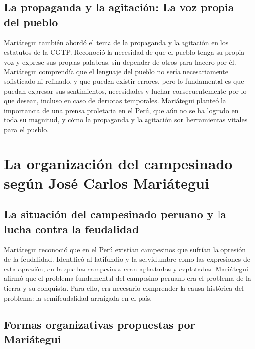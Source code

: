 \documentclass[
  letterpaper,
  DIV=11,
  numbers=noendperiod]{scrartcl}
\begin{document}
\hypertarget{la-propaganda-y-la-agitaciuxf3n-la-voz-propia-del-pueblo}{%
\subsection{La propaganda y la agitación: La voz propia del
pueblo}\label{la-propaganda-y-la-agitaciuxf3n-la-voz-propia-del-pueblo}}

Mariátegui también abordó el tema de la propaganda y la agitación en los
estatutos de la CGTP. Reconoció la necesidad de que el pueblo tenga su
propia voz y exprese sus propias palabras, sin depender de otros para
hacero por él. Mariátegui comprendía que el lenguaje del pueblo no sería
necesariamente sofisticado ni refinado, y que pueden existir errores,
pero lo fundamental es que puedan expresar sus sentimientos, necesidades
y luchar consecuentemente por lo que desean, incluso en caso de derrotas
temporales. Mariátegui planteó la importancia de una prensa proletaria
en el Perú, que aún no se ha logrado en toda su magnitud, y cómo la
propaganda y la agitación son herramientas vitales para el pueblo.

\hypertarget{la-organizaciuxf3n-del-campesinado-seguxfan-josuxe9-carlos-mariuxe1tegui}{%
\section{La organización del campesinado según José Carlos
Mariátegui}\label{la-organizaciuxf3n-del-campesinado-seguxfan-josuxe9-carlos-mariuxe1tegui}}

\hypertarget{la-situaciuxf3n-del-campesinado-peruano-y-la-lucha-contra-la-feudalidad}{%
\subsection{La situación del campesinado peruano y la lucha contra la
feudalidad}\label{la-situaciuxf3n-del-campesinado-peruano-y-la-lucha-contra-la-feudalidad}}

Mariátegui reconoció que en el Perú existían campesinos que sufrían la
opresión de la feudalidad. Identificó al latifundio y la servidumbre
como las expresiones de esta opresión, en la que los campesinos eran
aplastados y explotados. Mariátegui afirmó que el problema fundamental
del campesino peruano era el problema de la tierra y su conquista. Para
ello, era necesario comprender la causa histórica del problema: la
semifeudalidad arraigada en el país.

\hypertarget{formas-organizativas-propuestas-por-mariuxe1tegui}{%
\subsection{Formas organizativas propuestas por
Mariátegui}\label{formas-organizativas-propuestas-por-mariuxe1tegui}}
\end{document}

